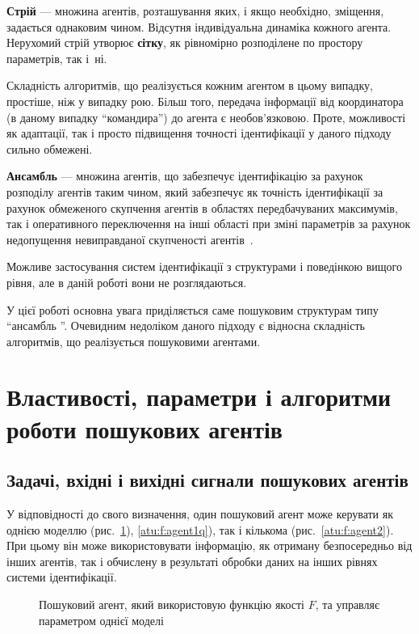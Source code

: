 \textbf{Стрій} --- множина агентів, розташування яких, і якщо необхідно,
зміщення, задається однаковим чином. Відсутня індивідуальна динаміка кожного
агента. Нерухомий стрій утворює \textbf{сітку},
як рівномірно розподілене по простору параметрів, так і~ні.

Складність алгоритмів, що реалізується кожним агентом в цьому
випадку, простіше, ніж у випадку рою. Більш того, передача
інформації від координатора (в даному випадку ``командира'')
до агента є необов'язковою. Проте, можливості як адаптації, так
і просто підвищення точності ідентифікації у даного підходу
сильно обмежені.

\textbf {Ансамбль} ---
множина агентів, що забезпечує ідентифікацію за рахунок розподілу агентів таким
чином, який забезпечує як точність ідентифікації за рахунок обмеженого
скупчення агентів в областях передбачуваних максимумів, так і оперативного
переключення на інші області при зміні параметрів за рахунок недопущення
невиправданої скупченості агентів~\cite{atu_ric2016}.

Можливе застосування систем ідентифікації з структурами
і поведінкою вищого рівня, але в даній роботі вони не
розглядаються.

У цієї роботі основна увага приділяється саме пошуковим структурам типу
``ансамбль ''. Очевидним недоліком даного підходу є відносна складність
алгоритмів, що реалізується пошуковими агентами.



\section{Властивості, параметри і алгоритми роботи пошукових агентів} %

\subsection{Задачі, вхідні і вихідні сигнали пошукових агентів} %

У відповідності до свого визначення, один пошуковий агент може керувати як
однією моделлю (рис.~\ref{atu:f:agent1}), \ref{atu:f:agent1q}),
так і кількома (рис.~\ref{atu:f:agent2}). При цьому він
може використовувати інформацію, як отриману безпосередньо від інших агентів,
так і обчислену в результаті обробки даних на інших рівнях системи
ідентифікації.

\begin{figure}[htb!]
\begin{center}

\end{center}
\caption{Пошуковий агент, який використовую функцію якості $F$, та управляє параметром однієї моделі}
\label{atu:f:agent1}
\end{figure}


